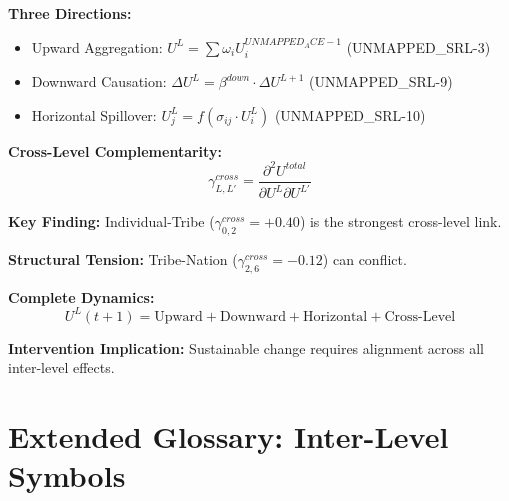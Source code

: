 \begin{tcolorbox}[colback=gray!5!white, colframe=gray!75!black, title=Inter-Level Dynamics Summary]

\textbf{Three Directions:}
\begin{itemize}
\item Upward Aggregation: $U^L = \sum \omega_i U^{UNMAPPED_ACE-1}_i$ (UNMAPPED_SRL-3)
\item Downward Causation: $\Delta U^L = \beta^{down} \cdot \Delta U^{L+1}$ (UNMAPPED_SRL-9)
\item Horizontal Spillover: $U^L_j = f(\sigma_{ij} \cdot U^L_i)$ (UNMAPPED_SRL-10)
\end{itemize}

\textbf{Cross-Level Complementarity:}
$$\gamma^{cross}_{L,L'} = \frac{\partial^2 U^{total}}{\partial U^L \partial U^{L'}}$$

\textbf{Key Finding:}
Individual-Tribe ($\gamma^{cross}_{0,2} = +0.40$) is the strongest cross-level link.

\textbf{Structural Tension:}
Tribe-Nation ($\gamma^{cross}_{2,6} = -0.12$) can conflict.

\textbf{Complete Dynamics:}
$$U^L(t+1) = \text{Upward} + \text{Downward} + \text{Horizontal} + \text{Cross-Level}$$

\textbf{Intervention Implication:}
Sustainable change requires alignment across all inter-level effects.

\end{tcolorbox}

\section{Extended Glossary: Inter-Level Symbols}
\label{sec:aaa-extended-glossary}

